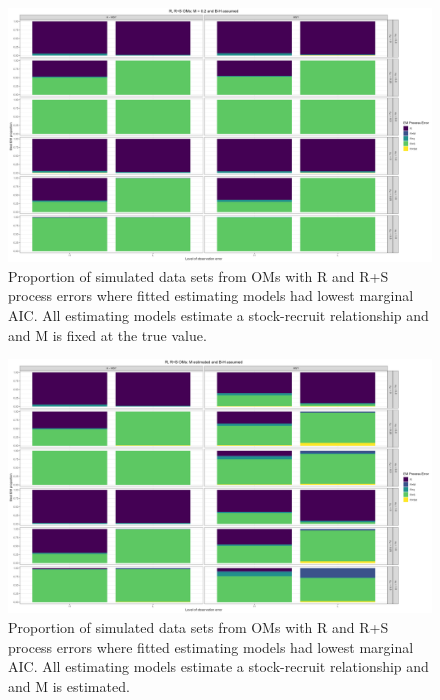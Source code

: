 \documentclass[
  12pt,
]{article}
\begin{document}
\begin{landscape}
\begin{figure}
\caption{Proportion of simulated data sets from OMs with R and R+S process errors where fitted estimating models had lowest marginal AIC. All estimating models estimate a stock-recruit relationship and and M is fixed at the true value.} \label{naa_om_proportion_best_aic_SR_MF}
\begin{center}
\includegraphics[width = \textwidth]{naa_om_proportion_best_aic_SR_MF.png}
\end{center}
\end{figure}
\end{landscape}

\begin{landscape}
\begin{figure}
\caption{Proportion of simulated data sets from OMs with R and R+S process errors where fitted estimating models had lowest marginal AIC. All estimating models estimate a stock-recruit relationship and and M is estimated.} \label{naa_om_proportion_best_aic_SR_ME}
\begin{center}
\includegraphics[width = \textwidth]{naa_om_proportion_best_aic_SR_ME.png}
\end{center}
\end{figure}
\end{landscape}
\end{document}
